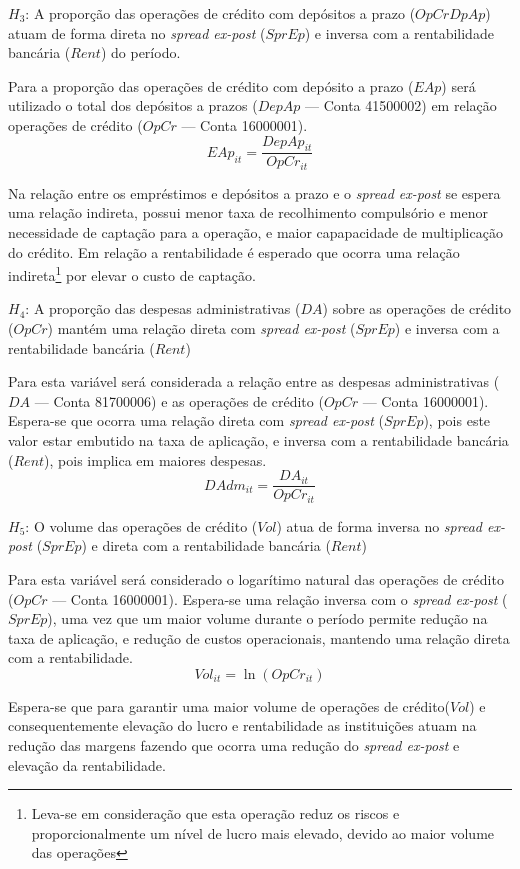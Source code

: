 \documentclass[12pt,12pt,openright,oneside,a4paper,chapter=TITLE,section=TITLE,subsection=TITLE,subsubsection=TITLE,english,french,spanish,portugues,sumario=tradicional]{abntex2}
\begin{document}
\(H_{3}\): A proporção das operações de crédito com depósitos a prazo (\(OpCrDpAp\)) atuam de forma direta no \emph{spread ex-post} (\(SprEp\)) e inversa com a rentabilidade bancária (\(Rent\)) do período.

Para a proporção das operações de crédito com depósito a prazo (\(EAp\)) será utilizado o total dos depósitos a prazos (\(DepAp\) --- Conta 41500002) em relação operações de crédito (\(OpCr\) --- Conta 16000001).
\[
EAp_{it} = \frac{DepAp_{it}}{OpCr_{it}}
\]

Na relação entre os empréstimos e depósitos a prazo e o \emph{spread ex-post} se espera uma relação indireta, possui menor taxa de recolhimento compulsório e menor necessidade de captação para a operação, e maior capapacidade de multiplicação do crédito. Em relação a rentabilidade é esperado que ocorra uma relação indireta\footnote{Leva-se em consideração que esta operação reduz os riscos e proporcionalmente um nível de lucro mais elevado, devido ao maior volume das operações} por elevar o custo de captação.

\(H_{4}\): A proporção das despesas administrativas (\(DA\)) sobre as operações de crédito (\(OpCr\)) mantém uma relação direta com \emph{spread ex-post} (\(SprEp\)) e inversa com a rentabilidade bancária (\(Rent\))

Para esta variável será considerada a relação entre as despesas administrativas (\(DA\) --- Conta 81700006) e as operações de crédito (\(OpCr\) --- Conta 16000001). Espera-se que ocorra uma relação direta com \emph{spread ex-post} (\(SprEp\)), pois este valor estar embutido na taxa de aplicação, e inversa com a rentabilidade bancária (\(Rent\)), pois implica em maiores despesas.
\[
DAdm_{it} = \frac{DA_{it}}{OpCr_{it}}
\]

\(H_{5}\): O volume das operações de crédito (\(Vol\)) atua de forma inversa no \emph{spread ex-post} (\(SprEp\)) e direta com a rentabilidade bancária (\(Rent\))

Para esta variável será considerado o logarítimo natural das operações de crédito (\(OpCr\) --- Conta 16000001). Espera-se uma relação inversa com o \emph{spread ex-post} (\(SprEp\)), uma vez que um maior volume durante o período permite redução na taxa de aplicação, e redução de custos operacionais, mantendo uma relação direta com a rentabilidade.
\[
Vol_{it} = \ln(OpCr_{it})
\]

Espera-se que para garantir uma maior volume de operações de crédito(\(Vol\)) e consequentemente elevação do lucro e rentabilidade as instituições atuam na redução das margens fazendo que ocorra uma redução do \emph{spread ex-post} e elevação da rentabilidade.
\end{document}
